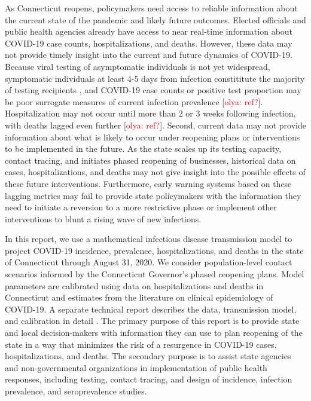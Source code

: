 \documentclass[11pt]{article}
\newcommand{\comment}[1]{[\textcolor{red}{#1}]}
\begin{document}

As Connecticut reopens, policymakers need access to reliable information about the current state of the pandemic and likely future outcomes.  Elected officials and public health agencies already have access to near real-time information about COVID-19 case counts, hospitalizations, and deaths.  However, these data may not provide timely insight into the current and future dynamics of COVID-19.  Because viral testing of asymptomatic individuals is not yet widespread, symptomatic individuals at least 4-5 days from infection constititute the majority of testing recipients \citep{lauer2020incubation, bi2020epidemiology, li2020early, linton2020incubation, he2020estimation, salje2020estimating, wei2020presymptomatic}, and COVID-19 case counts or positive test proportion may be poor surrogate measures of current infection prevalence \comment{olya: ref?}.   Hospitalization may not occur until more than 2 or 3 weeks following infection, with deaths lagged even further \comment{olya: ref?}.  Second, current data may not provide information about what is likely to occur under reopening plans or interventions to be implemented in the future. As the state scales up its testing capacity, contact tracing, and initiates phased reopening of businesses, historical data on cases, hospitalizations, and deaths may not give insight into the possible effects of these future interventions.  Furthermore, early warning systems based on these lagging metrics may fail to provide state policymakers with the information they need to initiate a reversion to a more restrictive phase or implement other interventions to blunt a rising wave of new infections. 


In this report, we use a mathematical infectious disease transmission model to project COVID-19 incidence, prevalence, hospitalizations, and deaths in the state of Connecticut through August 31, 2020.  We consider population-level contact scenarios informed by the Connecticut Governor's phased reopening plans.  Model parameters are calibrated using data on hospitalizations and deaths in Connecticut and estimates from the literature on clinical epidemiology of COVID-19.  A separate technical report describes the data, transmission model, and calibration in detail \citep{morozova2020tech}.  The primary purpose of this report is to provide state and local decision-makers with information they can use to plan reopening of the state in a way that minimizes the risk of a resurgence in COVID-19 cases, hospitalizations, and deaths.  The secondary purpose is to assist state agencies and non-governmental organizations in implementation of public health responses, including testing, contact tracing, and design of incidence, infection prevalence, and seroprevalence studies. 
\end{document}

